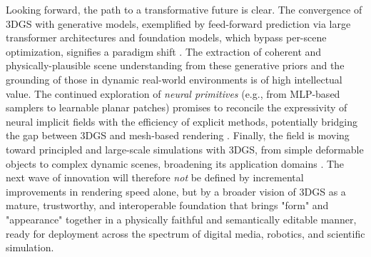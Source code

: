 \documentclass[11pt,a4paper]{article}
\begin{document}
Looking forward, the path to a transformative future is clear. The convergence of 3DGS with generative models, exemplified by feed-forward prediction via large transformer architectures and foundation models, which bypass per-scene optimization, signifies a paradigm shift \cite{arxiv:2605.07287v2,arxiv:2603.25265v2}. The extraction of coherent and physically-plausible scene understanding from these generative priors and the grounding of those in dynamic real-world environments is of high intellectual value. The continued exploration of \emph{neural primitives} (e.g., from MLP-based samplers to learnable planar patches) promises to reconcile the expressivity of neural implicit fields with the efficiency of explicit methods, potentially bridging the gap between 3DGS and mesh-based rendering \cite{arxiv:2510.08491v2,arxiv:2606.03877v1,arxiv:2411.08508v4,arxiv:2602.14493v1}. Finally, the field is moving toward principled and large-scale simulations with 3DGS, from simple deformable objects to complex dynamic scenes, broadening its application domains \cite{arxiv:2403.11453v1,arxiv:2503.12284v1}. The next wave of innovation will therefore \emph{not} be defined by incremental improvements in rendering speed alone, but by a broader vision of 3DGS as a mature, trustworthy, and interoperable foundation that brings "form" and "appearance" together in a physically faithful and semantically editable manner, ready for deployment across the spectrum of digital media, robotics, and scientific simulation.
\end{document}
